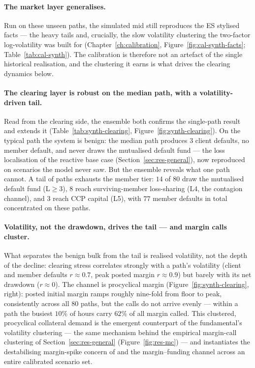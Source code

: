 \paragraph{The market layer generalises.}
Run on these unseen paths, the simulated mid still reproduces the ES stylised facts --- the heavy tails and,
crucially, the slow volatility clustering the two-factor log-volatility was built for
(Chapter~\ref{ch:calibration}, Figure~\ref{fig:cal-synth-facts}; Table~\ref{tab:cal-synth}). The calibration
is therefore not an artefact of the single historical realisation, and the clustering it earns is what drives
the clearing dynamics below.

\paragraph{The clearing layer is robust on the median path, with a volatility-driven tail.}
Read from the clearing side, the ensemble both confirms the single-path result and extends it
(Table~\ref{tab:synth-clearing}, Figure~\ref{fig:synth-clearing}). On the typical path the system is benign:
the median path produces $3$ client defaults, no member default, and never draws the mutualised default fund
--- the loss localisation of the reactive base case (Section~\ref{sec:res-general}), now reproduced on
scenarios the model never saw. But the ensemble reveals what one path cannot. A tail of paths exhausts the
member tier: $14$ of $80$ draw the mutualised default fund (L$\geq3$), $8$ reach surviving-member loss-sharing
(L4, the contagion channel), and $3$ reach CCP capital (L5), with $77$ member defaults in total concentrated
on these paths.

\paragraph{Volatility, not the drawdown, drives the tail --- and margin calls cluster.}
What separates the benign bulk from the tail is realised volatility, not the depth of the decline: clearing
stress correlates strongly with a path's volatility (client and member defaults $r\approx0.7$, peak posted
margin $r\approx0.9$) but barely with its net drawdown ($r\approx0$). The channel is procyclical margin
(Figure~\ref{fig:synth-clearing}, right): posted initial margin ramps roughly nine-fold from floor to peak,
consistently across all $80$ paths, but the calls do not arrive evenly --- within a path the busiest $10\%$ of
hours carry $62\%$ of all margin called. This clustered, procyclical collateral demand is the emergent
counterpart of the fundamental's volatility clustering --- the same mechanism behind the empirical margin-call
clustering of Section~\ref{sec:res-general} (Figure~\ref{fig:res-mc}) --- and instantiates the destabilising
margin-spike concern of \citet{glasserman_wu_2018} and the \citet{brunnermeier_pedersen_2009} margin--funding
channel across an entire calibrated scenario set.

